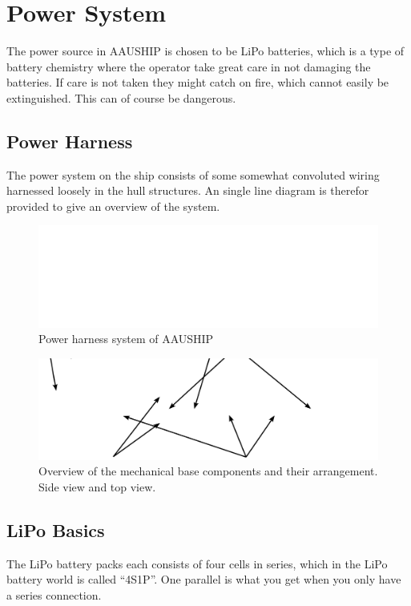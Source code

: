 \section{Power System}

The power source in AAUSHIP is chosen to be LiPo batteries, which is
a type of battery chemistry where the operator take great care in not damaging
the batteries. If care is not taken they might catch on fire, which
cannot easily be extinguished. This can of course be dangerous.

\subsection{Power Harness}
The power system on the ship consists of some somewhat convoluted
wiring harnessed loosely in the hull structures. An single line
diagram is therefor provided to give an overview of the system.

\begin{figure}[htbp]
	\includegraphics[width=\textwidth]{fig/harness}
	\caption{Power harness system of AAUSHIP}
	\label{fig:harness}
\end{figure}

\begin{figure}[htbp]
	\includegraphics[width=\textwidth]{fig/mechanical}
	\caption{Overview of the mechanical base components and their
	arrangement. Side view and top view.}
	\label{fig:mechanical}
\end{figure}

\subsection{LiPo Basics}
The LiPo battery packs each consists of four cells in series, which in
the LiPo battery world is called ``4S1P''. One parallel is what you get
when you only have a series connection.

